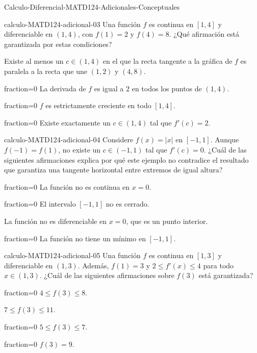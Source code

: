 \documentclass[10pt]{article}
\begin{document}
\begin{quiz}{Calculo-Diferencial-MATD124-Adicionales-Conceptuales}
\begin{multi}[single=true,shuffle=false]{calculo-MATD124-adicional-03}
Una función $f$ es continua en $[1,4]$ y diferenciable en $(1,4)$,
con $f(1)=2$ y $f(4)=8$. ¿Qué afirmación está garantizada por estas
condiciones?
    \item* Existe al menos un $c\in(1,4)$ en el que la recta tangente
    a la gráfica de $f$ es paralela a la recta que une $(1,2)$ y $(4,8)$.
    \item[fraction=0] La derivada de $f$ es igual a $2$ en todos los
    puntos de $(1,4)$.
    \item[fraction=0] $f$ es estrictamente creciente en todo $[1,4]$.
    \item[fraction=0] Existe exactamente un $c\in(1,4)$ tal que $f'(c)=2$.
\end{multi}

\begin{multi}[single=true,shuffle=false]{calculo-MATD124-adicional-04}
Considere $f(x)=|x|$ en $[-1,1]$. Aunque $f(-1)=f(1)$, no existe
un $c\in(-1,1)$ tal que $f'(c)=0$. ¿Cuál de las siguientes afirmaciones
explica por qué este ejemplo no contradice el resultado que garantiza
una tangente horizontal entre extremos de igual altura?
    \item[fraction=0] La función no es continua en $x=0$.
    \item[fraction=0] El intervalo $[-1,1]$ no es cerrado.
    \item* La función no es diferenciable en $x=0$, que es un punto interior.
    \item[fraction=0] La función no tiene un mínimo en $[-1,1]$.
\end{multi}

\begin{multi}[single=true,shuffle=false]{calculo-MATD124-adicional-05}
Una función $f$ es continua en $[1,3]$ y diferenciable en $(1,3)$.
Además, $f(1)=3$ y $2\leq f'(x)\leq4$ para todo $x\in(1,3)$.
¿Cuál de las siguientes afirmaciones sobre $f(3)$ está garantizada?
    \item[fraction=0] $4\leq f(3)\leq8$.
    \item* $7\leq f(3)\leq11$.
    \item[fraction=0] $5\leq f(3)\leq7$.
    \item[fraction=0] $f(3)=9$.
\end{multi}


\end{quiz}
\end{document}
